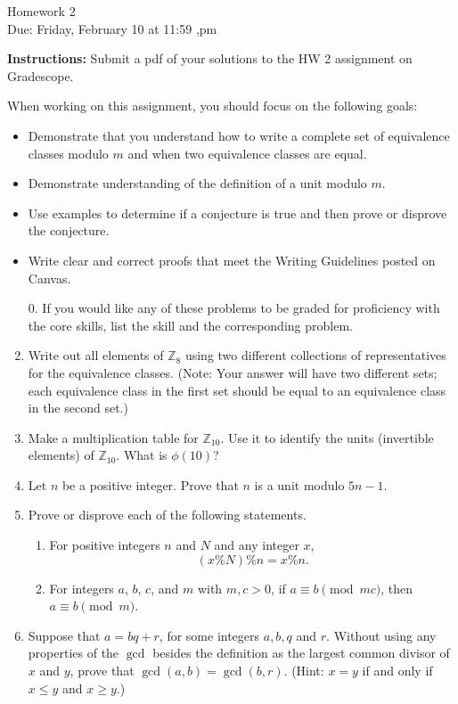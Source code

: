 \documentclass[12pt]{article}
\newcommand{\Z}{\mathbb{Z}}
\begin{document}
\begin{center}
{\Large Homework 2}\\
Due: Friday,  February 10 at 11:59 ,pm\\


\end{center}
{\bf Instructions:} Submit a pdf of your solutions to the HW 2 assignment on Gradescope. 

When working on this assignment, you should focus on the following goals:
\begin{itemize}
\item Demonstrate that you understand how to write a complete set of equivalence classes modulo $m$ and when two equivalence classes are equal. 
\item Demonstrate understanding of the definition of a unit modulo $m$.  
\item Use examples to determine if a conjecture is true and then prove or disprove the conjecture. 
\item Write clear and correct proofs that meet the Writing Guidelines posted on Canvas.
\end{itemize}

\begin{enumerate}
\item[0.] If you would like any of these problems to be graded for proficiency with the core skills, list the skill and the corresponding problem. 
\item Write out all elements of $\Z_{8}$ using two different collections of representatives for the equivalence classes.  (Note: Your answer will have two different sets; each equivalence class in the first set should be equal to an equivalence class in the second set.)
\item Make a multiplication table for $\Z_{10}$. Use it to identify the units (invertible elements) of $\Z_{10}$.  What is $\phi(10)$?
\item Let $n$ be a positive integer. Prove that $n$ is a unit modulo $5n-1$. 

\item Prove or disprove each of the following statements.
\begin{enumerate}
\item For positive integers $n$ and $N$ and any integer $x$, $$(x\% N)\% n= x\% n.$$
\item For integers $a$, $b$, $c$, and $m$ with $m,c>0$, if $a\equiv b\pmod{mc}$, then $a\equiv b\pmod{m}$. 
\end{enumerate} 
\item Suppose that $a=bq+r$, for some integers $a,b, q$ and $r$. Without using any properties of the $\gcd$ besides the definition as the largest common divisor of $x$ and $y$, prove that $\gcd(a,b)=\gcd(b,r)$.  (Hint: $x=y$ if and only if $x\le y$ and $x\ge y$.)

\end{enumerate}
\end{document}
